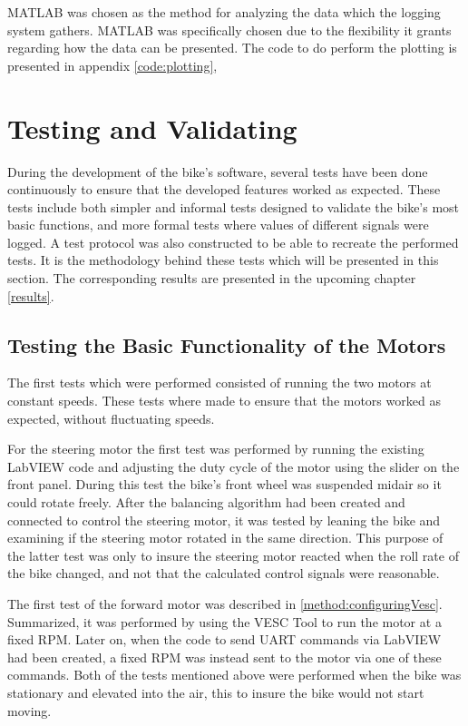 MATLAB was chosen as the method for analyzing the data which the logging system gathers. MATLAB was specifically chosen due to the flexibility it grants regarding how the data can be presented. The code to do perform the plotting is presented in appendix \ref{code:plotting},

\section{Testing and Validating}

During the development of the bike's software, several tests have been done continuously to ensure that the developed features worked as expected. These tests include both simpler and informal tests designed to validate the bike's most basic functions, and more formal tests where values of different signals were logged. A test protocol was also constructed to be able to recreate the performed tests. It is the methodology behind these tests which will be presented in this section. The corresponding results are presented in the upcoming chapter \ref{results}.

\subsection{Testing the Basic Functionality of the Motors}

The first tests which were performed consisted of running the two motors at constant speeds. These tests where made to ensure that the motors worked as expected, without fluctuating speeds. 

For the steering motor the first test was performed by running the existing LabVIEW code and adjusting the duty cycle of the motor using the slider on the front panel. During this test the bike's front wheel was suspended midair so it could rotate freely. After the balancing algorithm had been created and connected to control the steering motor, it was tested by leaning the bike and examining if the steering motor rotated in the same direction. This purpose of the latter test was only to insure the steering motor reacted when the roll rate of the bike changed, and not that the calculated control signals were reasonable.

The first test of the forward motor was described in \ref{method:configuringVesc}. Summarized, it was performed by using the VESC Tool to run the motor at a fixed RPM. Later on, when the code to send UART commands via LabVIEW had been created, a fixed RPM was instead sent to the motor via one of these commands. Both of the tests mentioned above were performed when the bike was stationary and elevated into the air, this to insure the bike would not start moving.

